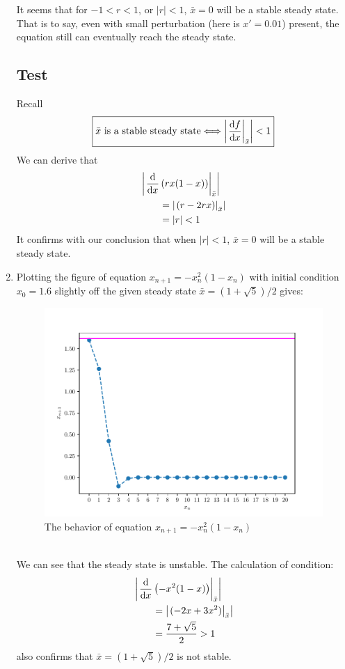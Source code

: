 \begin{homeworkProblem}[2]
\begin{enumerate}
It seems that for $-1 < r < 1$, or $|r| < 1$, $\bar x = 0$ will be a stable
steady state. That is to say, even with small perturbation (here is $x' = 0.01$)
present, the equation still can eventually reach the steady state.

\segline

\subsection{Test}
Recall \[
    \boxed{
    \bar x \text{ is a stable steady state}
    \Longleftrightarrow
    \left| \left.\frac{\mathrm{d}f}{\mathrm{d}x}\right|_{\bar x} \right| < 1
    }
\]
We can derive that
\[
    \begin{aligned}
        &\left|\left.\frac{\mathrm{d}}{\mathrm{d}x} \left(rx(1-x)\right)\right|_{\bar x}\right|\\
        &\qquad = \left| \left.(r - 2rx)\right|_{\bar x} \right|\\
        &\qquad = |r| < 1
    \end{aligned}
\]
It confirms with our conclusion that when $|r| < 1$, $\bar x = 0$ will be a
stable steady state.
\pagebreak
\item Plotting the figure of equation $x_{n+1} = -x_n^2(1-x_n)$ with initial
condition $x_0 = 1.6$ slightly off the given steady state $\bar x = (1+ \sqrt{5}
)/2$ gives:
\begin{figure}
    \centering
    \caption{The behavior of equation $x_{n+1} = -x_n^2(1-x_n)$}
    \includegraphics[scale=0.6]{../fig/fig2(b)}
\end{figure}
\\
We can see that the steady state is unstable. The calculation of condition:
\[
    \begin{aligned}
        &\left|\left.\frac{\mathrm{d}}{\mathrm{d}x} \left(-x^2(1-x)\right)\right|_{\bar x}\right|\\
        &\qquad = \left| \left.(-2x + 3x^2)\right|_{\bar x} \right|\\
        &\qquad = \frac{7+\sqrt{5}}{2} > 1
    \end{aligned}
\]
also confirms that $\bar x = (1+\sqrt{5})/2$ is not stable.


\end{enumerate}
\end{homeworkProblem}

